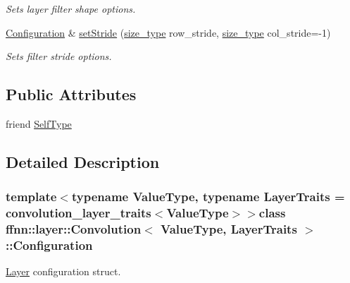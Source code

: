 \begin{DoxyCompactItemize}
\begin{DoxyCompactList}\small\item\em Sets layer filter shape options. \end{DoxyCompactList}\item 
\hyperlink{classffnn_1_1layer_1_1_convolution_1_1_configuration}{Configuration} \& \hyperlink{classffnn_1_1layer_1_1_convolution_1_1_configuration_a0f9a97644735bdb6d8396f9910753962}{set\-Stride} (\hyperlink{namespaceffnn_a63b90a2fd70eb76684eac482a51633e5}{size\-\_\-type} row\-\_\-stride, \hyperlink{namespaceffnn_a63b90a2fd70eb76684eac482a51633e5}{size\-\_\-type} col\-\_\-stride=-\/1)
\begin{DoxyCompactList}\small\item\em Sets filter stride options. \end{DoxyCompactList}\end{DoxyCompactItemize}
\subsection*{Public Attributes}
\begin{DoxyCompactItemize}
\item 
friend \hyperlink{classffnn_1_1layer_1_1_convolution_1_1_configuration_aa21d93db4f05a3777606069ec91c0b45}{Self\-Type}
\end{DoxyCompactItemize}


\subsection{Detailed Description}
\subsubsection*{template$<$typename Value\-Type, typename Layer\-Traits = convolution\-\_\-layer\-\_\-traits$<$\-Value\-Type$>$$>$class ffnn\-::layer\-::\-Convolution$<$ Value\-Type, Layer\-Traits $>$\-::\-Configuration}

\hyperlink{classffnn_1_1layer_1_1_layer}{Layer} configuration struct. 

